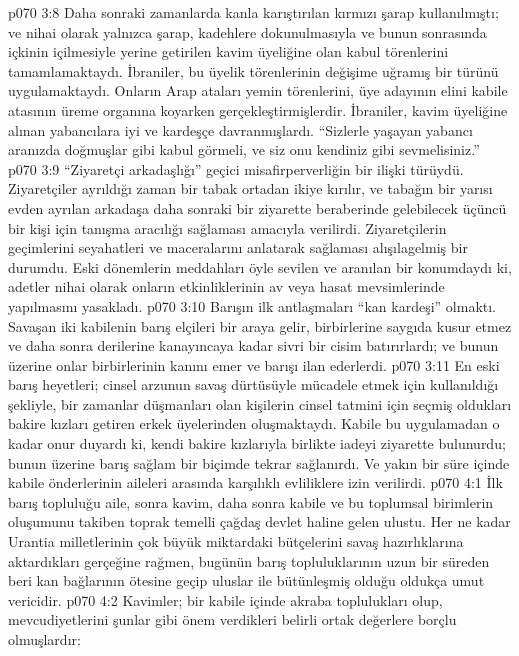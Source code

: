 \vs p070 3:8 Daha sonraki zamanlarda kanla karıştırılan kırmızı şarap kullanılmıştı; ve nihai olarak yalnızca şarap, kadehlere dokunulmasıyla ve bunun sonrasında içkinin içilmesiyle yerine getirilen kavim üyeliğine olan kabul törenlerini tamamlamaktaydı. İbraniler, bu üyelik törenlerinin değişime uğramış bir türünü uygulamaktaydı. Onların Arap ataları yemin törenlerini, üye adayının elini kabile atasının üreme organına koyarken gerçekleştirmişlerdir. İbraniler, kavim üyeliğine alınan yabancılara iyi ve kardeşçe davranmışlardı. “Sizlerle yaşayan yabancı aranızda doğmuşlar gibi kabul görmeli, ve siz onu kendiniz gibi sevmelisiniz.”
\vs p070 3:9 “Ziyaretçi arkadaşlığı” geçici misafirperverliğin bir ilişki türüydü. Ziyaretçiler ayrıldığı zaman bir tabak ortadan ikiye kırılır, ve tabağın bir yarısı evden ayrılan arkadaşa daha sonraki bir ziyarette beraberinde gelebilecek üçüncü bir kişi için tanışma aracılığı sağlaması amacıyla verilirdi. Ziyaretçilerin geçimlerini seyahatleri ve maceralarını anlatarak sağlaması alışılagelmiş bir durumdu. Eski dönemlerin meddahları öyle sevilen ve aranılan bir konumdaydı ki, adetler nihai olarak onların etkinliklerinin av veya hasat mevsimlerinde yapılmasını yasakladı.
\vs p070 3:10 Barışın ilk antlaşmaları “kan kardeşi” olmaktı. Savaşan iki kabilenin barış elçileri bir araya gelir, birbirlerine saygıda kusur etmez ve daha sonra derilerine kanayıncaya kadar sivri bir cisim batırırlardı; ve bunun üzerine onlar birbirlerinin kanını emer ve barışı ilan ederlerdi.
\vs p070 3:11 En eski barış heyetleri; cinsel arzunun savaş dürtüsüyle mücadele etmek için kullanıldığı şekliyle, bir zamanlar düşmanları olan kişilerin cinsel tatmini için seçmiş oldukları bakire kızları getiren erkek üyelerinden oluşmaktaydı. Kabile bu uygulamadan o kadar onur duyardı ki, kendi bakire kızlarıyla birlikte iadeyi ziyarette bulunurdu; bunun üzerine barış sağlam bir biçimde tekrar sağlanırdı. Ve yakın bir süre içinde kabile önderlerinin aileleri arasında karşılıklı evliliklere izin verilirdi.
\vs p070 4:1 İlk barış topluluğu aile, sonra kavim, daha sonra kabile ve bu toplumsal birimlerin oluşumunu takiben toprak temelli çağdaş devlet haline gelen ulustu. Her ne kadar Urantia milletlerinin çok büyük miktardaki bütçelerini savaş hazırlıklarına aktardıkları gerçeğine rağmen, bugünün barış topluluklarının uzun bir süreden beri kan bağlarının ötesine geçip uluslar ile bütünleşmiş olduğu oldukça umut vericidir.
\vs p070 4:2 Kavimler; bir kabile içinde akraba toplulukları olup, mevcudiyetlerini şunlar gibi önem verdikleri belirli ortak değerlere borçlu olmuşlardır:
